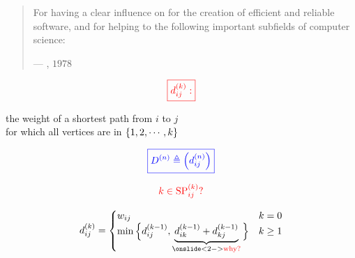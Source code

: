 
\begin{frame}{}
  {\centerline{}}

  \begin{quote}
    {\small
      For having a clear influence on  for the creation of efficient and reliable software,
      and for helping to  the following important subfields of computer science: \\[3pt] \pause
    }

    \hfill --- , $1978$
  \end{quote}
\end{frame}

\begin{frame}{}
  \[
    \textcolor{red}{\boxed{d_{ij}^{(k)}:}}
  \]
  \begin{center}
    the weight of a shortest path from $i$ to $j$ \\[3pt]
    for which all  vertices are in $\left\{1, 2, \cdots, k\right\}$
  \end{center}

  \pause
  \[
    \textcolor{blue}{\boxed{D^{(n)} \triangleq \Big(d_{ij}^{(n)}\Big)}}
  \]
\end{frame}

\begin{frame}{}
  \[
    \textcolor{red}{k \in \text{SP}_{ij}^{(k)}?}
  \]

  \vspace{-0.20cm}

  \vspace{-0.20cm}
  \[
    d_{ij}^{(k)} = \begin{cases}
      w_{ij}	& k = 0 \\
      \min\Big\{ d_{ij}^{(k-1)}, \underbrace{d_{ik}^{(k-1)} + d_{kj}^{(k-1)}}_{\onslide<2->{\red{\text{why?}}}} \Big\} & k \ge 1
    \end{cases}
  \]

\end{frame}

